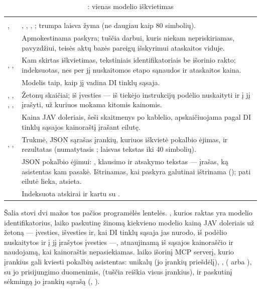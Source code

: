 \begin{xltabular}{\textwidth}{@{}L{38mm}Y@{}}
\caption{: vienas modelio iškvietimas}\label{tab:data:lc}\\
\toprule
{} &  \\
\midrule
\endfirsthead
\toprule
{} &  \\
\midrule
\endhead
\bottomrule
\endlastfoot
{},  & , , , ; trumpa laisva žyma (ne daugiau kaip 80 simbolių). \\
 & Apmokestinama paskyra; tuščia darbui, kuris niekam nepriskiriamas, pavyzdžiui, teisės aktų bazės pareigų išskyrimui ataskaitos viduje. \\
, ,  & Kam skirtas iškvietimas, tekstiniais identifikatoriais be išorinio rakto;  indeksuotas, nes per jį nuskaitomos etapo sąnaudos ir ataskaitos kaina. \\
 & Modelis taip, kaip jį vadina DI tinklų sąsaja. \\
, , , ,  & Žetonų skaičiai; iš įvesties --- iš tiekėjo instrukcijų podėlio nuskaityti ir į jį įrašyti, už kuriuos mokama kitomis kainomis. \\
 & Kaina JAV doleriais, šeši skaitmenys po kablelio, apskaičiuojama pagal DI tinklų sąsajos kainoraštį įrašant eilutę. \\
, ,  & Trukmė, JSON sąrašas įrankių, kuriuos iškvietė pokalbio ėjimas, ir rezultatas (numatytasis ; laisvas tekstas iki 40 simbolių). \\
 & JSON pokalbio ėjimui: , klausimo ir atsakymo tekstas --- įrašas, ką asistentas kam pasakė. Ištrinamas, kai paskyra galutinai ištrinama (); pati eilutė lieka, atsieta. \\
 & Indeksuota atskirai ir kartu su . \\
\end{xltabular}

Šalia stovi dvi mažos tos pačios programėlės lentelės. , kurios raktas yra
modelio identifikatorius, laiko paskutinę žinomą kiekvieno modelio kainą JAV doleriais už
žetoną --- įvesties, išvesties ir, kai DI tinklų sąsaja jas nurodo, iš podėlio nuskaitytos ir
į jį įrašytos įvesties ---, atnaujinamą iš sąsajos kainoraščio ir naudojamą, kai kainoraštis
nepasiekiamas.  laiko išorinį MCP serverį, kurio įrankius gali kviesti
pokalbių asistentas: unikalų  (jo įrankių priešdėlį), ,
 ( arba ),  su jo prisijungimo duomenimis,
 (tuščia reiškia visus įrankius),  ir paskutinį sėkmingą jo
įrankių sąrašą (, ).

